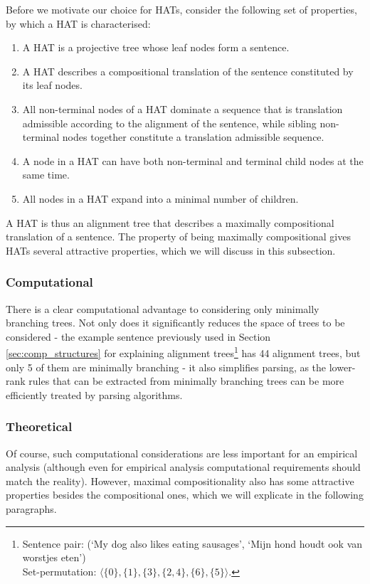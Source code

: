 Before we motivate our choice for HATs, consider the following set of properties, by which a HAT is characterised:\begin{enumerate}
\item A HAT is a projective tree whose leaf nodes form a sentence.
\item A HAT describes a compositional translation of the sentence constituted by its leaf nodes.
\item All non-terminal nodes of a HAT dominate a sequence that is translation admissible according to the alignment of the sentence, while sibling non-terminal nodes together constitute a translation admissible sequence.
\item A node in a HAT can have both non-terminal and terminal child nodes at the same time.
\item All nodes in a HAT expand into a minimal number of children.
\end{enumerate}

\noindent A HAT is thus an alignment tree that describes a maximally compositional translation of a sentence. The property of being maximally compositional gives HATs several attractive properties, which we will discuss in this subsection.

\subsubsection{Computational}
There is a clear computational advantage to considering only minimally branching trees. Not only does it significantly reduces the space of trees to be considered - the example sentence previously used in Section \ref{sec:comp_structures} for explaining alignment trees\footnote{Sentence pair: (`My dog also likes eating sausages', `Mijn hond houdt ook van worstjes eten')\\Set-permutation: $\langle \{0\}, \{1\}, \{3\}, \{2,4\}, \{6\}, \{5\}\rangle$. } has 44 alignment trees, but only 5 of them are minimally branching - it also simplifies parsing, as the lower-rank rules that can be extracted from minimally branching trees can be more efficiently treated by parsing algorithms.

\subsubsection{Theoretical}

Of course, such computational considerations are less important for an empirical analysis (although even for empirical analysis computational requirements should match the reality). However, maximal compositionality also has some attractive properties besides the compositional ones, which we will explicate in the following paragraphs.


